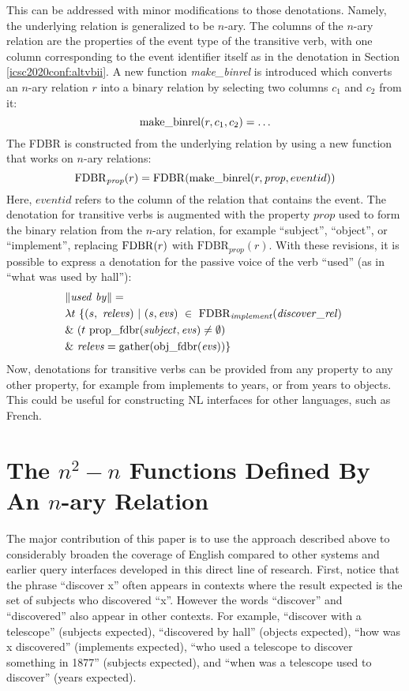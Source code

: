 \documentclass[../main.tex]{subfiles}
\begin{document}
\begin{refsection}
This can be addressed with minor modifications to those denotations. Namely, the underlying relation is generalized to be $n$-ary. The columns of the $n$-ary relation are the properties of the event type of the transitive verb, with one column corresponding to the event identifier itself as in the denotation in Section \ref{icsc2020conf:altvbii}. A new function {\em make\_binrel} is introduced which converts an $n$-ary relation $r$ into a binary relation by selecting two columns $c_1$ and $c_2$ from it:
\[
\mathrm{make\_binrel}({r}, {c_1}, {c_2}) = \ldots
\]
The FDBR is constructed from the underlying relation by using a new function that works on $n$-ary relations:
\[\mathrm{FDBR}_{\mathit{prop}}(r) = \mathrm{FDBR}({\mathrm{make\_binrel}({r}, {\mathit{prop}}, {eventid})})\]
Here, $\mathit{eventid}$ refers to the column of the relation that contains the event.
The denotation for transitive verbs is augmented with the property $\mathit{prop}$ used to form the binary relation from the $n$-ary relation, for example ``subject'', ``object'', or ``implement'', replacing $\mathrm{FDBR}({r})$ with $\mathrm{FDBR}_{\mathit{prop}}(r)$.  With these revisions, it is possible to express a denotation for the passive voice of the verb ``used'' (as in ``what was used by hall''):
\begin{equation*}
	\begin{split}
		&\meaningof{used\ by} = \\
		&\lambda t\ \{ (s,\ \mathit{relevs})\ |\ (s, \mathit{evs})\ \in\ \mathrm{FDBR}_{\mathit{implement}}(\relation{\discover})\  \\
		& \&\ (t\ \propfdbr{subject}{evs} \neq \emptyset) \\
		& \&\ \mathit{relevs} = \gatherevs{\objfdbr{evs}} \}
	\end{split}
\end{equation*}
Now, denotations for transitive verbs can be provided from any property to any other property, for example from implements to years, or from years to objects. This could be useful for constructing NL interfaces for other languages, such as French.

\section{The $n^2-n$ Functions Defined By An $n$-ary Relation}

The major contribution of this paper is to use the approach described above to considerably broaden the coverage of English compared to other systems and earlier \cite{graphmqslide,peelar2016accommodating} query interfaces developed in this direct line of research.
First, notice that the phrase ``discover x'' often appears in contexts where the result expected is
the set of subjects who discovered ``x''. However the words ``discover'' and ``discovered''
also appear in other contexts. For example, ``discover with a telescope'' (subjects expected), ``discovered by
hall'' (objects expected), ``how was x discovered''  (implements expected), ``who used a telescope
to discover something in 1877'' (subjects expected), and ``when was a telescope used to discover'' (years
expected).


\end{refsection}
\end{document}
